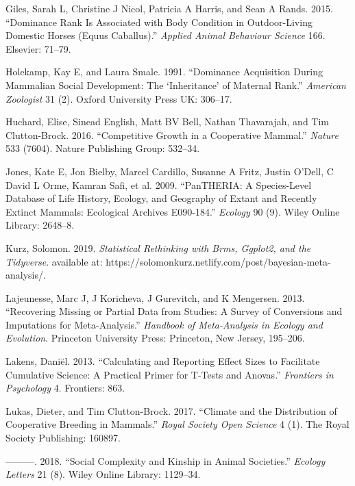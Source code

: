 \documentclass[]{article}
\begin{document}
\leavevmode\hypertarget{ref-giles2015dominance}{}%
Giles, Sarah L, Christine J Nicol, Patricia A Harris, and Sean A Rands.
2015. ``Dominance Rank Is Associated with Body Condition in
Outdoor-Living Domestic Horses (Equus Caballus).'' \emph{Applied Animal
Behaviour Science} 166. Elsevier: 71--79.

\leavevmode\hypertarget{ref-holekamp1991dominance}{}%
Holekamp, Kay E, and Laura Smale. 1991. ``Dominance Acquisition During
Mammalian Social Development: The `Inheritance' of Maternal Rank.''
\emph{American Zoologist} 31 (2). Oxford University Press UK: 306--17.

\leavevmode\hypertarget{ref-huchard2016competitive}{}%
Huchard, Elise, Sinead English, Matt BV Bell, Nathan Thavarajah, and Tim
Clutton-Brock. 2016. ``Competitive Growth in a Cooperative Mammal.''
\emph{Nature} 533 (7604). Nature Publishing Group: 532--34.

\leavevmode\hypertarget{ref-jones2009pantheria}{}%
Jones, Kate E, Jon Bielby, Marcel Cardillo, Susanne A Fritz, Justin
O'Dell, C David L Orme, Kamran Safi, et al. 2009. ``PanTHERIA: A
Species-Level Database of Life History, Ecology, and Geography of Extant
and Recently Extinct Mammals: Ecological Archives E090-184.''
\emph{Ecology} 90 (9). Wiley Online Library: 2648--8.

\leavevmode\hypertarget{ref-kurz2019rethinking}{}%
Kurz, Solomon. 2019. \emph{Statistical Rethinking with Brms, Ggplot2,
and the Tidyverse}. available at:
https://solomonkurz.netlify.com/post/bayesian-meta-analysis/.

\leavevmode\hypertarget{ref-lajeunesse2013recovering}{}%
Lajeunesse, Marc J, J Koricheva, J Gurevitch, and K Mengersen. 2013.
``Recovering Missing or Partial Data from Studies: A Survey of
Conversions and Imputations for Meta-Analysis.'' \emph{Handbook of
Meta-Analysis in Ecology and Evolution}. Princeton University Press:
Princeton, New Jersey, 195--206.

\leavevmode\hypertarget{ref-lakens2013calculating}{}%
Lakens, Daniël. 2013. ``Calculating and Reporting Effect Sizes to
Facilitate Cumulative Science: A Practical Primer for T-Tests and
Anovas.'' \emph{Frontiers in Psychology} 4. Frontiers: 863.

\leavevmode\hypertarget{ref-lukas2017climate}{}%
Lukas, Dieter, and Tim Clutton-Brock. 2017. ``Climate and the
Distribution of Cooperative Breeding in Mammals.'' \emph{Royal Society
Open Science} 4 (1). The Royal Society Publishing: 160897.

\leavevmode\hypertarget{ref-lukas2018social}{}%
---------. 2018. ``Social Complexity and Kinship in Animal Societies.''
\emph{Ecology Letters} 21 (8). Wiley Online Library: 1129--34.
\end{document}
